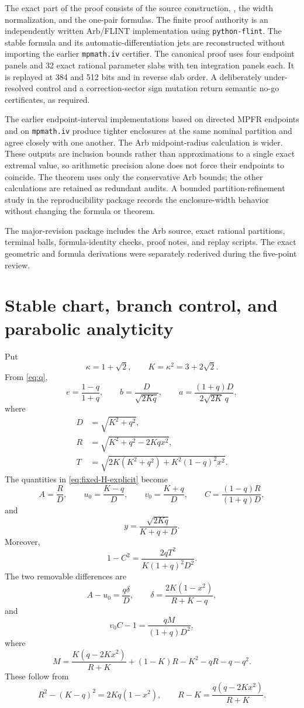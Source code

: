 \documentclass[11pt]{article}
\numberwithin{equation}{section}
\theoremstyle{remark}
\begin{document}
The exact part of the proof consists of the source construction, , the width normalization, and the one-pair formulas.  The finite proof authority is an independently written Arb/FLINT implementation using \texttt{python-flint}.  The stable formula and its automatic-differentiation jets are reconstructed without importing the earlier \texttt{mpmath.iv} certifier.  The canonical proof uses four endpoint panels and 32 exact rational parameter slabs with ten integration panels each.  It is replayed at 384 and 512 bits and in reverse slab order.  A deliberately under-resolved control and a correction-sector sign mutation return semantic no-go certificates, as required.

The earlier endpoint-interval implementations based on directed MPFR endpoints and on \texttt{mpmath.iv} produce tighter enclosures at the same nominal partition and agree closely with one another.  The Arb midpoint-radius calculation is wider.  These outputs are inclusion bounds rather than approximations to a single exact extremal value, so arithmetic precision alone does not force their endpoints to coincide.  The theorem uses only the conservative Arb bounds; the other calculations are retained as redundant audits.  A bounded partition-refinement study in the reproducibility package records the enclosure-width behavior without changing the formula or theorem.

The major-revision package includes the Arb source, exact rational partitions, terminal balls, formula-identity checks, proof notes, and replay scripts.  The exact geometric and formula derivations were separately rederived during the five-point review.

\appendix

\section{Stable chart, branch control, and parabolic analyticity}
\label{app:q-chart}

Put
\[
  \kappa=1+\sqrt2,
  \qquad K=\kappa^2=3+2\sqrt2.
\]
From \eqref{eq:q},
\[
  e=\frac{1-q}{1+q},
  \qquad
  b=\frac D{\sqrt{2Kq}},
  \qquad
  a=\frac{(1+q)D}{2\sqrt{2K}\,q},
\]
where
\begin{align*}
  D&=\sqrt{K^2+q^2},\\
  R&=\sqrt{K^2+q^2-2Kqx^2},\\
  T&=\sqrt{2K(K^2+q^2)+K^2(1-q)^2x^2}.
\end{align*}
The quantities in \eqref{eq:fixed-H-explicit} become
\[
  A=\frac RD,
  \qquad
  u_0=\frac{K-q}{D},
  \qquad
  v_0=\frac{K+q}{D},
  \qquad
  C=\frac{(1-q)R}{(1+q)D},
\]
and
\[
  y=\frac{\sqrt{2Kq}}{K+q+D}.
\]
Moreover,
\[
  1-C^2=\frac{2qT^2}{K(1+q)^2D^2}.
\]
The two removable differences are
\[
  A-u_0=\frac{q\delta}{D},
  \qquad
  \delta=\frac{2K(1-x^2)}{R+K-q},
\]
and
\[
  v_0C-1=\frac{qM}{(1+q)D^2},
\]
where
\[
  M=\frac{K(q-2Kx^2)}{R+K}+(1-K)R-K^2-qR-q-q^2.
\]
These follow from
\[
  R^2-(K-q)^2=2Kq(1-x^2),
  \qquad
  R-K=\frac{q(q-2Kx^2)}{R+K}.
\]
\end{document}
